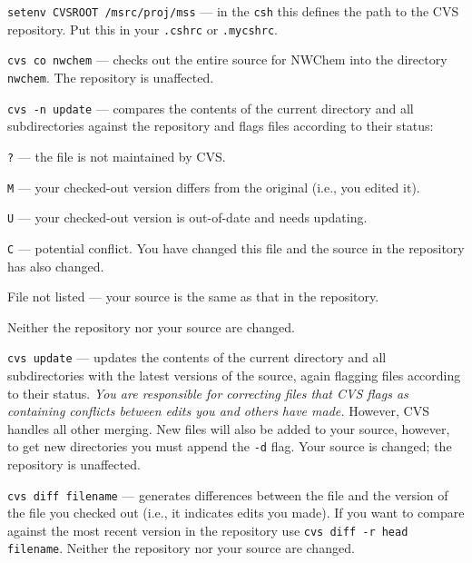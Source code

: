 \begin{description}
\item{\verb+setenv CVSROOT /msrc/proj/mss+} --- in the \verb+csh+ this
  defines the path to the CVS repository.  Put this in your
  \verb+.cshrc+ or \verb+.mycshrc+.
 
\item{\verb+cvs co nwchem+} --- checks out the entire source for NWChem into
  the directory \verb+nwchem+.  The repository is unaffected.
  
\item{\verb+cvs -n update+} --- compares the contents of the current
  directory and all subdirectories against the repository and flags
  files according to their status:
  \begin{description}
  \item{\verb+?+} --- the file is not maintained by CVS.
  \item{\verb+M+} --- your checked-out version differs from the original
    (i.e., you edited it).
  \item{\verb+U+} --- your checked-out version is out-of-date and
    needs updating.
  \item{\verb+C+} --- potential conflict. You have changed this file
    and the source in the repository has also changed.
  \item{File not listed} --- your source is the same as that in the repository.
  \end{description}
  Neither the repository nor your source are changed.

\item{\verb+cvs update+} --- updates the contents of the current
  directory and all subdirectories with the latest versions of the
  source, again flagging files according to their status. {\em You are
    responsible for correcting files that CVS flags as containing
    conflicts between edits you and others have made.} However, CVS
  handles all other merging.  New files will also be added to your
  source, however, to get new directories you must append the
  \verb+-d+ flag.  Your source is changed; the repository is
  unaffected.

\item{\verb+cvs diff filename+} --- generates differences between the
  file and the version of the file you checked out (i.e., it indicates
  edits you made).  If you want to compare against the most recent
  version in the repository use \verb+cvs diff -r head filename+.
  Neither the repository nor your source are changed.


\end{description}
